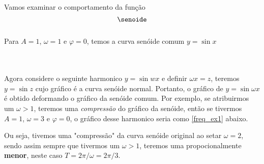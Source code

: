 Vamos examinar o comportamento da função 
\begin{equation}
\label{harm1}
    \senoide
\end{equation}
\\
Para $A=1$, $\omega = 1$ e $\varphi = 0$, temos a curva senóide comum $y = \sin{x}$\\
\\
\\
Agora considere o seguinte harmonico $y = \sin{wx}$ e definir $\omega x = z$, teremos
$y = \sin{z}$ cujo gráfico é a curva senóide normal. Portanto, o gráfico de 
$y = \sin{\omega x}$ é obtido deformando o gráfico da senóide comum. Por exemplo,
se atribuirmos um $\omega > 1$, teremos uma \textit{compressão} do gráfico da
senóide, então se tivermos $A = 1$, $\omega = 3$ e $\varphi = 0$, o gráfico 
desse harmonico seria como \ref{freq_ex1} abaixo.

Ou seja, tivemos uma "compressão" da curva senóide original ao setar $\omega = 2$,
sendo assim sempre que tivermos um $\omega > 1$, teremos uma propocionalmente
\textbf{menor}, neste caso $T = 2\pi / \omega = 2\pi / 3$.

